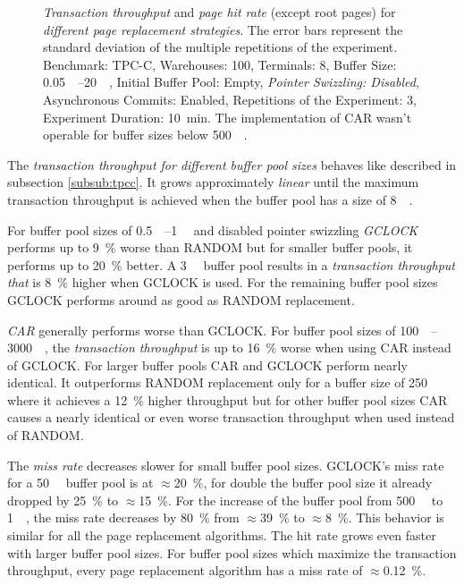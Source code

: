 \begin{@empty}
\begin{figure}[ht!]
{
		}
		\caption{\emph{Transaction throughput} and \emph{page hit rate} (except root pages) for \emph{different page replacement strategies}. The error bars represent the standard deviation of the multiple repetitions of the experiment. Benchmark: TPC-C, Warehouses: 100, Terminals: 8, Buffer Size: \SIrange{0.05}{20}{\gibi\byte}, Initial Buffer Pool: Empty, \emph{Pointer Swizzling: Disabled}, Asynchronous Commits: Enabled, Repetitions of the Experiment: 3, Experiment Duration: \SI{10}{\minute}. The implementation of CAR wasn't operable for buffer sizes below \SI{500}{\mebi\byte}.}
		\label{fig:noswizzlingpagereplacement}
	\end{figure}
\end{@empty}

	The \emph{transaction throughput for different buffer pool sizes} behaves like described in subsection \ref{subsub:tpcc}. It grows approximately \emph{linear} until the maximum transaction throughput is achieved when the buffer pool has a size of \SI{8}{\gibi\byte}.
	
	For buffer pool sizes of \SIrange{0.5}{1}{\gibi\byte} and disabled pointer swizzling \emph{GCLOCK} performs up to \SI{9}{\percent} worse than RANDOM but for smaller buffer pools, it performs up to \SI{20}{\percent} better. A \SI{3}{\gibi\byte} buffer pool results in a \emph{transaction throughput that} is \SI{8}{\percent} higher when GCLOCK is used. For the remaining buffer pool sizes GCLOCK performs around as good as RANDOM replacement.
	
	\emph{CAR} generally performs worse than GCLOCK. For buffer pool sizes of \SIrange{100}{3000}{\mebi\byte}, the \emph{transaction throughput} is up to \SI{16}{\percent} worse when using CAR instead of GCLOCK. For larger buffer pools CAR and GCLOCK perform nearly identical. It outperforms RANDOM replacement only for a buffer size of \SI{250}{\mebi\byte} where it achieves a \SI{12}{\percent} higher throughput but for other buffer pool sizes CAR causes a nearly identical or even worse transaction throughput when used instead of RANDOM.
	
	The \emph{miss rate} decreases slower for small buffer pool sizes. GCLOCK's miss rate for a \SI{50}{\mebi\byte} buffer pool is at $\approx$\SI{20}{\percent}, for double the buffer pool size it already dropped by \SI{25}{\percent} to $\approx$\SI{15}{\percent}. For the increase of the buffer pool from \SI{500}{\mebi\byte} to \SI{1}{\gibi\byte}, the miss rate decreases by \SI{80}{\percent} from $\approx$\SI{39}{\percent} to $\approx$\SI{8}{\percent}. This behavior is similar for all the page replacement algorithms. The hit rate grows even faster with larger buffer pool sizes. For buffer pool sizes which maximize the transaction throughput, every page replacement algorithm has a miss rate of $\approx$\SI{0.12}{\percent}.
	
